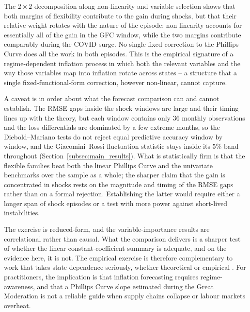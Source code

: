 \documentclass[12pt,a4paper]{article}
\begin{document}
The $2 \times 2$ decomposition along non-linearity and variable selection shows that both margins of flexibility contribute to the gain during shocks, but that their relative weight rotates with the nature of the episode: non-linearity accounts for essentially all of the gain in the GFC window, while the two margins contribute comparably during the COVID surge. No single fixed correction to the Phillips Curve does all the work in both episodes. This is the empirical signature of a regime-dependent inflation process in which both the relevant variables and the way those variables map into inflation rotate across states -- a structure that a single fixed-functional-form correction, however non-linear, cannot capture.

A caveat is in order about what the forecast comparison can and cannot establish. The RMSE gaps inside the shock windows are large and their timing lines up with the theory, but each window contains only 36 monthly observations and the loss differentials are dominated by a few extreme months, so the Diebold--Mariano tests do not reject equal predictive accuracy window by window, and the Giacomini--Rossi fluctuation statistic stays inside its 5\% band throughout (Section~\ref{subsec:main_results}). What is statistically firm is that the flexible families beat both the linear Phillips Curve and the univariate benchmarks over the sample as a whole; the sharper claim that the gain is concentrated in shocks rests on the magnitude and timing of the RMSE gaps rather than on a formal rejection. Establishing the latter would require either a longer span of shock episodes or a test with more power against short-lived instabilities.

The exercise is reduced-form, and the variable-importance results are correlational rather than causal. What the comparison delivers is a sharper test of whether the linear constant-coefficient summary is adequate, and on the evidence here, it is not. The empirical exercise is therefore complementary to work that takes state-dependence seriously, whether theoretical \citep{benigno2023,harding2022} or empirical \citep{cbo2023,coulombe2024,coulombe2022ml}. For practitioners, the implication is that inflation forecasting requires regime-awareness, and that a Phillips Curve slope estimated during the Great Moderation is not a reliable guide when supply chains collapse or labour markets overheat.

\newpage


\end{document}
